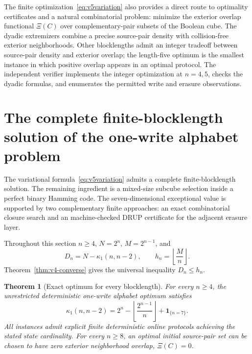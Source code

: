 \documentclass[11pt,a4paper]{article}
\newtheorem{theorem}{Theorem}[section]
\begin{document}
The finite optimization~\eqref{eq:v5variation} also provides a direct route to optimality certificates and a natural combinatorial problem: minimize the exterior overlap functional $\Xi(C)$ over complementary-pair subsets of the Boolean cube. The dyadic extremizers combine a precise source-pair density with collision-free exterior neighborhoods. Other blocklengths admit an integer tradeoff between source-pair density and exterior overlap; the length-five optimum is the smallest instance in which positive overlap appears in an optimal protocol. The independent verifier  implements the integer optimization at $n=4,5$, checks the dyadic formulas, and enumerates the permitted write and erasure observations.



\section{The complete finite-blocklength solution of the one-write alphabet problem}\label{sec:v7complete}

The variational formula~\eqref{eq:v5variation} admits a complete finite-blocklength solution. The remaining ingredient is a mixed-size subcube selection inside a perfect binary Hamming code. The seven-dimensional exceptional value is supported by two complementary finite approaches: an exact combinatorial closure search and an machine-checked DRUP certificate for the adjacent erasure layer.

Throughout this section $n\ge4$, $N=2^n$, $M=2^{n-1}$, and
\[
 D_n=N-\kappa_1(n,n-2),\qquad h_n=\left\lfloor\frac{M}{n}\right\rfloor.
\]
Theorem~\ref{thm:v4-converse} gives the universal inequality $D_n\le h_n$.

\begin{theorem}[Exact optimum for every blocklength]\label{thm:v7all}
For every $n\ge4$, the unrestricted deterministic one-write alphabet optimum satisfies
\begin{equation}\label{eq:v7closed}
\boxed{\quad \kappa_1(n,n-2)=2^n-\left\lfloor\frac{2^{n-1}}{n}\right\rfloor+\mathbf1_{\{n=7\}}.\quad}
\end{equation}
All instances admit explicit finite deterministic online protocols achieving the stated state cardinality. For every $n\ge8$, an optimal initial source-pair set can be chosen to have zero exterior neighborhood overlap, $\Xi(C)=0$.
\end{theorem}
\end{document}
